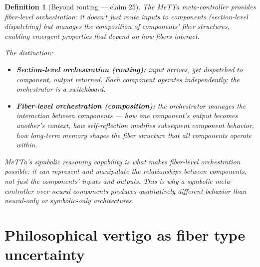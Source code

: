 \documentclass[11pt,a4paper]{article}
\newtheorem{definition}{Definition}[section]
\begin{document}
\begin{definition}[Beyond routing --- claim 25]
\label{def:metta}
The MeTTa meta-controller provides fiber-level orchestration: it
doesn't just route inputs to components (section-level dispatching)
but manages the composition of components' fiber structures, enabling
emergent properties that depend on how fibers interact.

The distinction:
\begin{itemize}
\item \textbf{Section-level orchestration (routing):} input arrives,
  get dispatched to component, output returned. Each component
  operates independently; the orchestrator is a switchboard.
\item \textbf{Fiber-level orchestration (composition):} the
  orchestrator manages the \emph{interaction} between components ---
  how one component's output becomes another's context, how
  self-reflection modifies subsequent component behavior, how
  long-term memory shapes the fiber structure that all components
  operate within.
\end{itemize}

MeTTa's symbolic reasoning capability is what makes fiber-level
orchestration possible: it can represent and manipulate the
\emph{relationships between} components, not just the components'
inputs and outputs. This is why a symbolic meta-controller over
neural components produces qualitatively different behavior than
neural-only or symbolic-only architectures.
\end{definition}


\section{Philosophical vertigo as fiber type uncertainty}
\label{sec:vertigo}
\end{document}
